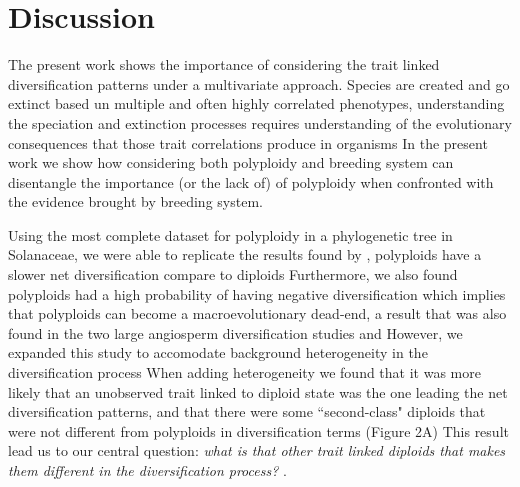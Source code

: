 \section{Discussion}

The present work shows the importance of considering the trait linked diversification patterns under a multivariate approach.
Species are created and go extinct based un multiple and often highly correlated phenotypes, understanding the speciation and extinction processes requires understanding of the evolutionary consequences that those trait correlations produce in organisms
In the present work we show how considering both polyploidy and breeding system can disentangle the importance (or the lack of) of polyploidy when confronted with the evidence brought by breeding system.\newline

Using the most complete dataset for polyploidy in a phylogenetic tree in Solanaceae, we were able to replicate the results found by \citet{mayrose_2011}, polyploids have a slower net diversification compare to diploids
Furthermore,  we also found polyploids had a high probability of having negative diversification which implies that polyploids can become a macroevolutionary dead-end, a result that was also found in the two large angiosperm diversification studies  \citet{mayrose_2011} and \citet{mayrose_2015}
However, we expanded this study to accomodate  background heterogeneity in the diversification process
When adding heterogeneity we found that it was more likely that an unobserved trait linked to diploid state was the one leading the net diversification patterns, and that there were some ``second-class" diploids that were not different from polyploids in diversification terms (Figure 2A)
This result lead us to our central question: \textit{what is that other trait linked diploids that makes them different in the diversification process? }.\newline

